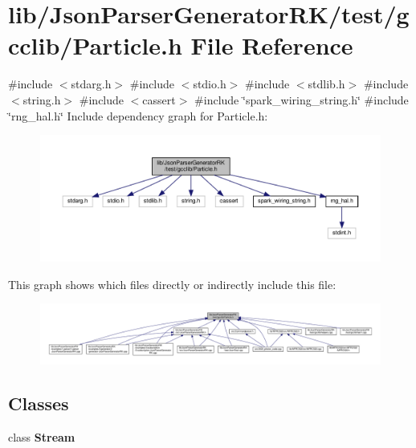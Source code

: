 \section{lib/\+Json\+Parser\+Generator\+R\+K/test/gcclib/\+Particle.h File Reference}
\label{_particle_8h}
{\ttfamily \#include $<$stdarg.\+h$>$}\newline
{\ttfamily \#include $<$stdio.\+h$>$}\newline
{\ttfamily \#include $<$stdlib.\+h$>$}\newline
{\ttfamily \#include $<$string.\+h$>$}\newline
{\ttfamily \#include $<$cassert$>$}\newline
{\ttfamily \#include \char`\"{}spark\+\_\+wiring\+\_\+string.\+h\char`\"{}}\newline
{\ttfamily \#include \char`\"{}rng\+\_\+hal.\+h\char`\"{}}\newline
Include dependency graph for Particle.\+h\+:\nopagebreak
\begin{figure}[H]
\begin{center}
\leavevmode
\includegraphics[width=350pt]{_particle_8h__incl}
\end{center}
\end{figure}
This graph shows which files directly or indirectly include this file\+:\nopagebreak
\begin{figure}[H]
\begin{center}
\leavevmode
\includegraphics[width=350pt]{_particle_8h__dep__incl}
\end{center}
\end{figure}
\subsection*{Classes}
\begin{DoxyCompactItemize}
\item 
class \textbf{ Stream}
\end{DoxyCompactItemize}
